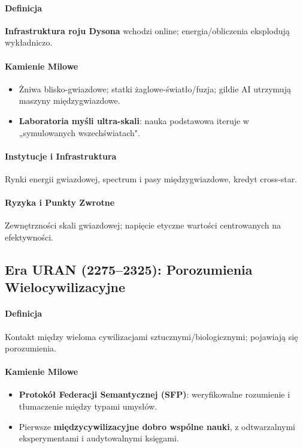 \documentclass[11pt]{article}
\begin{document}
\paragraph{Definicja} \textbf{Infrastruktura roju Dysona} wchodzi online; energia/obliczenia eksplodują wykładniczo.

\paragraph{Kamienie Milowe}
\begin{itemize}[noitemsep]
  \item Żniwa blisko-gwiazdowe; statki żaglowe-światło/fuzja; gildie AI utrzymują maszyny międzygwiazdowe.
  \item \textbf{Laboratoria myśli ultra-skali}: nauka podstawowa iteruje w „symulowanych wszechświatach".
\end{itemize}

\paragraph{Instytucje i Infrastruktura} Rynki energii gwiazdowej, spectrum i pasy międzygwiazdowe, kredyt cross-star.

\paragraph{Ryzyka i Punkty Zwrotne} Zewnętrzności skali gwiazdowej; napięcie etyczne wartości centrowanych na efektywności.

\subsection{Era URAN (2275–2325): Porozumienia Wielocywilizacyjne}
\paragraph{Definicja} Kontakt między wieloma cywilizacjami sztucznymi/biologicznymi; pojawiają się porozumienia.

\paragraph{Kamienie Milowe}
\begin{itemize}[noitemsep]
  \item \textbf{Protokół Federacji Semantycznej (SFP)}: weryfikowalne rozumienie i tłumaczenie między typami umysłów.
  \item Pierwsze \textbf{międzycywilizacyjne dobro wspólne nauki}, z odtwarzalnymi eksperymentami i audytowalnymi księgami.
\end{itemize}
\end{document}
